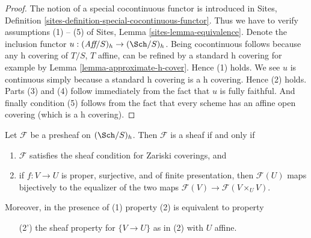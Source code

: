 \begin{proof}
The notion of a special cocontinuous functor is introduced in
Sites, Definition \ref{sites-definition-special-cocontinuous-functor}.
Thus we have to verify assumptions (1) -- (5) of
Sites, Lemma \ref{sites-lemma-equivalence}.
Denote the inclusion functor
$u : (\textit{Aff}/S)_h \to (\Sch/S)_h$.
Being cocontinuous follows because any h covering of
$T/S$, $T$ affine, can be refined by a standard h covering
for example by Lemma \ref{lemma-approximate-h-cover}. Hence (1) holds.
We see $u$ is continuous simply because a standard h covering
is a h covering.
Hence (2) holds. Parts (3) and (4) follow immediately from the fact
that $u$ is fully faithful. And finally condition (5) follows from the
fact that every scheme has an affine open covering (which is
a h covering).
\end{proof}

\begin{lemma}
\label{lemma-characterize-sheaf-h}
Let $\mathcal{F}$ be a presheaf on $(\Sch/S)_h$.
Then $\mathcal{F}$ is a sheaf if and only if
\begin{enumerate}
\item $\mathcal{F}$ satisfies the sheaf condition for
Zariski coverings, and
\item if $f : V \to U$ is proper, surjective, and of finite presentation, then
$\mathcal{F}(U)$ maps bijectively to the equalizer
of the two maps $\mathcal{F}(V) \to \mathcal{F}(V \times_U V)$.
\end{enumerate}
Moreover, in the presence of (1) property (2) is equivalent to
property
\begin{enumerate}
\item[(2')] the sheaf property for $\{V \to U\}$ as in (2) with $U$ affine.
\end{enumerate}
\end{lemma}

